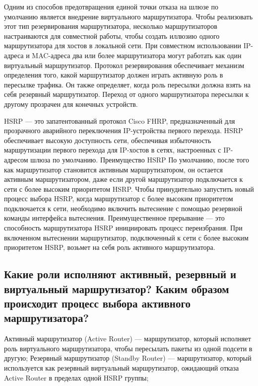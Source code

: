 Одним из способов предотвращения единой точки отказа на шлюзе по умолчанию является внедрение виртуального маршрутизатора. Чтобы реализовать этот тип резервирования маршрутизатора, несколько маршрутизаторов настраиваются для совместной работы, чтобы создать иллюзию одного маршрутизатора для хостов в локальной сети. При совместном использовании IP-адреса и MAC-адреса два или более маршрутизатора могут работать как один виртуальный маршрутизатор.
Протокол резервирования обеспечивает механизм определения того, какой маршрутизатор должен играть активную роль в пересылке трафика. Он также определяет, когда роль пересылки должна взять на себя резервный маршрутизатор. Переход от одного маршрутизатора пересылки к другому прозрачен для конечных устройств.

HSRP — это запатентованный протокол Cisco FHRP, предназначенный для прозрачного аварийного переключения IP-устройства первого перехода.
HSRP обеспечивает высокую доступность сети, обеспечивая избыточность маршрутизации первого перехода для IP-хостов в сетях, настроенных с IP-адресом шлюза по умолчанию.
Преимущество HSRP
По умолчанию, после того как маршрутизатор становится активным маршрутизатором, он остается активным маршрутизатором, даже если другой маршрутизатор подключается к сети с более высоким приоритетом HSRP.
Чтобы принудительно запустить новый процесс выбора HSRP, когда маршрутизатор с более высоким приоритетом подключается к сети, необходимо включить вытеснение с помощью  резервной  команды интерфейса вытеснения. Преимущественное прерывание — это способность маршрутизатора HSRP инициировать процесс переизбрания. При включенном вытеснении маршрутизатор, подключенный к сети с более высоким приоритетом HSRP, возьмет на себя роль активного маршрутизатора.

\subsection{Какие роли исполняют активный, резервный и виртуальный маршрутизатор? Каким образом происходит процесс
выбора активного маршрутизатора?}

Активный маршрутизатор (Active Router) — маршрутизатор, который исполняет роль виртуального маршрутизатора, чтобы пересылать пакеты из одной подсети в другую;
Резервный маршрутизатор (Standby Router) — маршрутизатор, который используется как резервный виртуальный маршрутизатор, ожидающий отказа Active Router в пределах одной HSRP группы;


